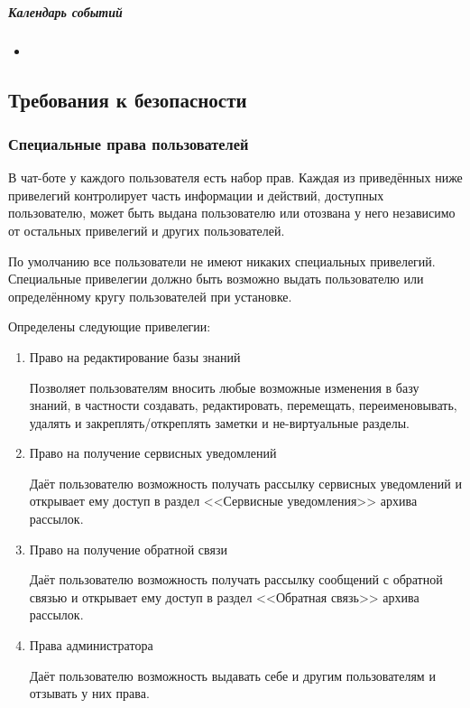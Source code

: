             \subparagraph{Календарь событий}
                \begin{itemize}
                    \item
                \end{itemize}
        \endgroup

\subsection{Требования к безопасности}
    \label{sec:req:sec}

    \subsubsection{Специальные права пользователей}
        \label{sec:req:sec:privs}
        В чат-боте у каждого пользователя есть набор прав. Каждая из приведённых ниже привелегий
        контролирует часть информации и действий, доступных пользователю,
        может быть выдана пользователю или отозвана у него независимо от остальных привелегий
        и других пользователей.

        По умолчанию все пользователи не имеют никаких специальных привелегий. Специальные привелегии
        должно быть возможно выдать пользователю или определённому кругу пользователей при установке.

        Определены следующие привелегии:
        \begin{enumerate}
            \item \label{itm:req:sec:privs:kbedit}
                Право на редактирование базы знаний

                Позволяет пользователям вносить любые возможные изменения в базу знаний,
                в частности создавать, редактировать, перемещать, переименовывать, удалять
                и закреплять/откреплять заметки и не-виртуальные разделы.

            \item \label{itm:req:sec:privs:service}
                Право на получение сервисных уведомлений

                Даёт пользователю возможность получать рассылку сервисных уведомлений и открывает ему доступ
                в раздел <<Сервисные уведомления>> архива рассылок.

            \item \label{itm:req:sec:privs:feedback}
                Право на получение обратной связи

                Даёт пользователю возможность получать рассылку сообщений с обратной связью и
                открывает ему доступ в раздел <<Обратная связь>> архива рассылок.

            \item \label{itm:req:sec:privs:admin}
                Права администратора

                Даёт пользователю возможность выдавать себе и другим пользователям и
                отзывать у них права.
        \end{enumerate}

